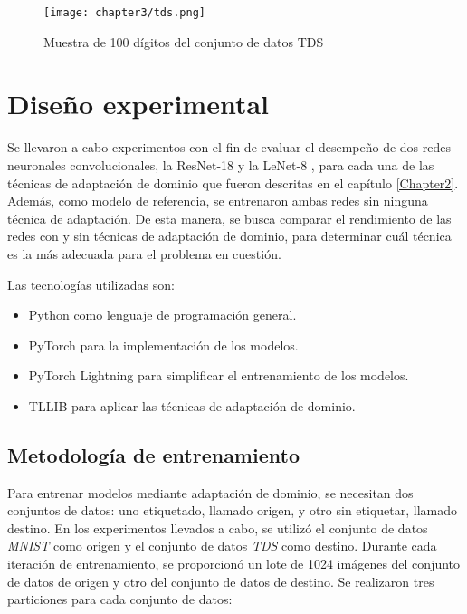 \begin{figure}[H]
    \centering
    \texttt{[image: chapter3/tds.png]}
    \caption[Conjunto de datos TDS]{Muestra de 100 dígitos del conjunto de datos TDS}
    \label{fig:tds}
\end{figure}

\section{Diseño experimental}

Se llevaron a cabo experimentos con el fin de evaluar el desempeño de dos redes neuronales convolucionales, la
ResNet-18 \parencite{he2016deep} y la LeNet-8 \parencite{lecun1998gradient}, para cada una de las técnicas de adaptación de dominio que fueron descritas en el capítulo
\ref{Chapter2}. Además, como modelo de referencia, se entrenaron ambas redes sin ninguna técnica de adaptación. De esta
manera, se busca comparar el rendimiento de las redes con y sin técnicas de adaptación de dominio, para determinar cuál
técnica es la más adecuada para el problema en cuestión.

Las tecnologías utilizadas son:

\begin{itemize}
    \item Python como lenguaje de programación general.
    \item PyTorch \parencite{paszke2019pytorch} para la implementación de los modelos.
    \item PyTorch Lightning \parencite{falcon2019pytorch-lightning} para simplificar el entrenamiento de los modelos.
    \item TLLIB \parencite{tllib} para aplicar las técnicas de adaptación de dominio.
\end{itemize}

\subsection{Metodología de entrenamiento}

Para entrenar modelos mediante adaptación de dominio, se necesitan dos conjuntos de datos: uno etiquetado, llamado
origen, y otro sin etiquetar, llamado destino. En los experimentos llevados a cabo, se utilizó el conjunto de datos
    {\it MNIST} como origen y el conjunto de datos {\it TDS} como destino. Durante cada iteración de entrenamiento, se
proporcionó un lote de 1024 imágenes del conjunto de datos de origen y otro del conjunto de datos de destino. Se
realizaron tres particiones para cada conjunto de datos:

